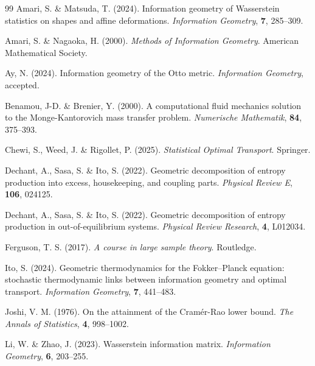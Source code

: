 \documentclass[11pt, a4paper]{article}
\begin{document}
	\begin{thebibliography}{99}
	Amari, S. \& Matsuda, T. (2024).
	Information geometry of {W}asserstein statistics on shapes and affine deformations.
	\textit{Information Geometry}, \textbf{7}, 285--309.
	
	Amari, S. \& Nagaoka, H. (2000). 
	\textit{Methods of Information Geometry}. 
	{American Mathematical Society}.
	
	Ay, N. (2024).
	Information geometry of the {O}tto metric.
	\textit{Information Geometry}, accepted.
	
	Benamou, J-D. \& Brenier, Y. (2000).
	A computational fluid mechanics solution to the {M}onge-{K}antorovich mass transfer problem.
	\textit{Numerische Mathematik}, \textbf{84}, 375--393.
	
	Chewi, S., Weed, J. \& Rigollet, P. (2025).
	\textit{Statistical Optimal Transport}. 
	Springer.
	
	Dechant, A., Sasa, S. \& Ito, S. (2022).
	Geometric decomposition of entropy production into excess, housekeeping, and coupling parts.
	\textit{Physical Review E}, \textbf{106}, 024125.
	
	Dechant, A., Sasa, S. \& Ito, S. (2022).
	Geometric decomposition of entropy production in out-of-equilibrium systems.
	\textit{Physical Review Research}, \textbf{4}, L012034.
	
	Ferguson, T. S. (2017). 
	\textit{A course in large sample theory}. 
	Routledge.
	
	Ito, S. (2024).
	Geometric thermodynamics for the Fokker--Planck equation: stochastic thermodynamic links between information geometry and optimal transport. 
	\textit{Information Geometry}, \textbf{7}, 441--483.
	
	Joshi, V. M. (1976).
	On the attainment of the {C}ram{\'e}r-{R}ao lower bound.
	\textit{The Annals of Statistics}, \textbf{4}, 998--1002.
	
	Li, W. \& Zhao, J. (2023).
	Wasserstein information matrix.
	\textit{Information Geometry}, \textbf{6}, 203--255.
	

\end{thebibliography}
\end{document}
